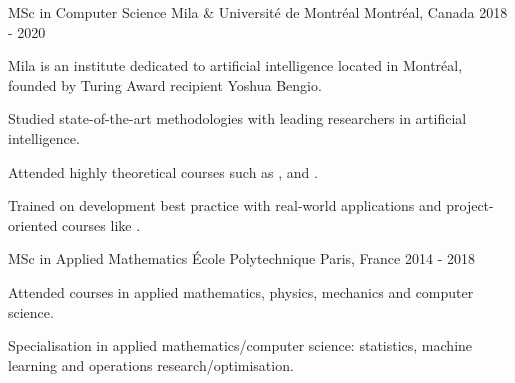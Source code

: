 \begin{cventries}
    \cventry
    {MSc in Computer Science} %
    {Mila \& Université de Montréal} %
    {Montréal, Canada} %
    {2018 - 2020} %
    {
            Mila is an institute dedicated to artificial intelligence located in Montréal, founded by Turing Award recipient Yoshua Bengio.
        \vspace{4.5mm}
        \begin{cvitems}
            \item Studied state-of-the-art methodologies with leading researchers in artificial intelligence.
            \item Attended highly theoretical courses such as ,  and .
            \item Trained on development best practice with real-world applications and project-oriented courses like .
        \end{cvitems}
    }

    \cventry
    {MSc in Applied Mathematics} %
    {École Polytechnique} %
    {Paris, France} %
    {2014 - 2018} %
    {
        \begin{cvitems} %
        \item Attended courses in applied mathematics, physics, mechanics and computer science.
        \item Specialisation in applied mathematics/computer science: statistics, machine learning and operations research/optimisation.
      \end{cvitems}
    }




\end{cventries}
